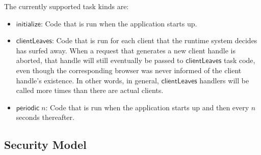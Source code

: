 \documentclass{article}
\newcommand{\mt}[1]{\mathsf{#1}}
\begin{document}
The currently supported task kinds are:
\begin{itemize}
\item $\mt{initialize}$: Code that is run when the application starts up.
\item $\mt{clientLeaves}$: Code that is run for each client that the runtime system decides has surfed away.  When a request that generates a new client handle is aborted, that handle will still eventually be passed to $\mt{clientLeaves}$ task code, even though the corresponding browser was never informed of the client handle's existence.  In other words, in general, $\mt{clientLeaves}$ handlers will be called more times than there are actual clients.
\item $\mt{periodic} \; n$: Code that is run when the application starts up and then every $n$ seconds thereafter.
\end{itemize}

\subsection{Security Model}
\end{document}
